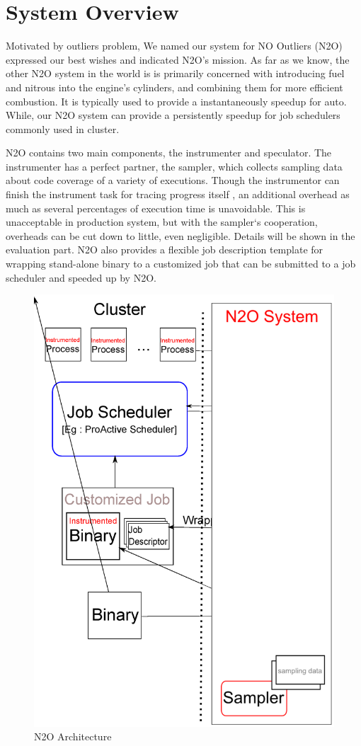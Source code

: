 \section{System Overview}

Motivated by outliers problem, We named our system for NO Outliers (N2O) expressed our best wishes and indicated N2O’s mission. As far as we know, the other N2O system in the world is is primarily concerned with introducing fuel and nitrous into the engine's cylinders, and combining them for more efficient combustion. It is typically used to provide a instantaneously speedup for auto. While, our N2O system can provide a persistently speedup for job schedulers commonly used in cluster.

N2O contains two main components, the instrumenter and speculator. The instrumenter has a perfect partner, the sampler, which collects sampling data about code coverage of a variety of executions. Though the instrumentor can finish the instrument task for tracing progress itself , an additional overhead as much as several percentages of execution time is unavoidable. This is unacceptable in production system, but with the sampler‘s cooperation, overheads can be cut down to little, even negligible. Details will be shown in the evaluation part. N2O also provides a flexible job description template for wrapping stand-alone binary to a customized job that can be submitted to a job scheduler and speeded up by N2O. 

\begin{figure}
\centering
\includegraphics[width=0.9\columnwidth]{figures/N2O_arch.eps}
\caption{N2O Architecture}
\label{figure:n2oarch}
\end{figure}

